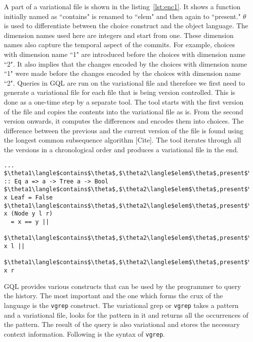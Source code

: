 A part of a variational file is shown in the listing~\ref{lst:enc1}. It shows a function initially named as ``contains" is renamed to ``elem" and then again to ``present." $\theta$ is used to differentiate between the choice construct and the object language. The dimension names used here are integers and start from one. These dimension names also capture the temporal aspect of the commits. For example, choices with dimension name ``1" are introduced before the choices with dimension name ``2". It also implies that the changes encoded by the choices with dimension name ``1" were made before the changes encoded by the choices with dimension name ``2". Queries in GQL are run on the variational file and therefore we first need to generate a variational file for each file that is being version controlled. This is done as a one-time step by a separate tool. The tool starts with the first version of the file and copies the contents into the variational file as is. From the second version onwards, it computes the differences and encodes them into choices. The difference between the previous and the current version of the file is found using the longest common subsequence algorithm [Cite]. The tool iterates through all the versions in a chronological order and produces a variational file in the end.%

\begin{lstlisting}[caption=Encoding of version history of a Haskell program file, label=lst:enc1, gobble=0, basicstyle=\ttfamily\small]
... 
$\theta1\langle$contains$\theta$,$\theta2\langle$elem$\theta$,present$\theta\rangle$$\theta\rangle$ :: Eq a => a -> Tree a -> Bool 
$\theta1\langle$contains$\theta$,$\theta2\langle$elem$\theta$,present$\theta\rangle$$\theta\rangle$ x Leaf = False 
$\theta1\langle$contains$\theta$,$\theta2\langle$elem$\theta$,present$\theta\rangle$$\theta\rangle$ x (Node y l r) 
  = x == y || 
    $\theta1\langle$contains$\theta$,$\theta2\langle$elem$\theta$,present$\theta\rangle$$\theta\rangle$ x l ||
    $\theta1\langle$contains$\theta$,$\theta2\langle$elem$\theta$,present$\theta\rangle$$\theta\rangle$ x r
\end{lstlisting}

GQL provides various constructs that can be used by the programmer to query the history. The most important and the one which forms the crux of the language is the \texttt{vgrep} construct. The variational grep or \texttt{vgrep} takes a pattern and a variational file, looks for the pattern in it and returns all the occurrences of the pattern. The result of the query is also variational and stores the necessary context information. Following is the syntax of \texttt{vgrep}.

